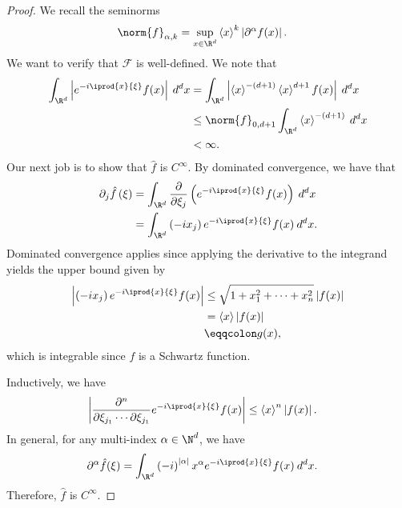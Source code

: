 \documentclass[10pt]{mypackage}
\renewcommand{\eqcolon}{\eqqcolon}
\begin{document}
\begin{proof}
  We recall the seminorms
  \begin{align*}
    \norm{f}_{\alpha,k} &= \sup_{x\in \R^d} \left\langle x \right\rangle^{k} \left\vert \partial^{\alpha}f(x) \right\vert.
  \end{align*}
  We want to verify that $ \mathcal{F} $ is well-defined. We note that
  \begin{align*}
    \int_{\R^{d}}^{} \left\vert e^{-i \iprod{x}{\xi}} f(x)\right\vert\:d^{d}x &= \int_{\R^d}^{} \left\vert \left\langle x \right\rangle^{-\left( d+1 \right)} \left\langle x \right\rangle^{d+1} f(x) \right\vert\:d^{d}x\\
                                                                              &\leq \norm{f}_{0,d+1} \int_{\R^d}^{} \left\langle x \right\rangle^{-\left( d+1 \right)}\:d^{d}x\\
                                                                              &< \infty.
  \end{align*}
  Our next job is to show that $ \hat{f} $ is $C^{\infty}$. By dominated convergence, we have that
  \begin{align*}
    \partial_{j}\hat{f}\left( \xi \right) &= \int_{\R^d}^{} \frac{\partial}{\partial \xi_j}\left( e^{-i \iprod{x}{\xi}}f(x) \right)\:d^{d}x\\
                                          &= \int_{\R^d}^{} \left( -ix_j \right)e^{-i \iprod{x}{\xi}}f(x)\:d^{d}x.
  \end{align*}
  Dominated convergence applies since applying the derivative to the integrand yields the upper bound given by
  \begin{align*}
    \left\vert \left( -ix_j \right)e^{-i \iprod{x}{\xi}}f(x) \right\vert&\leq \sqrt{1 + x_1^2 + \cdots + x_n^2} \left\vert f(x) \right\vert\\
                                                                        &= \left\langle x \right\rangle\left\vert f(x) \right\vert\\
                                                                        &\eqcolon g(x),
  \end{align*}
  which is integrable since $f$ is a Schwartz function.

  Inductively, we have
  \begin{align*}
    \left\vert \frac{\partial^{n}}{\partial \xi_{j_1}\cdots \partial \xi_{j_1}} e^{-i \iprod{x}{\xi}}f(x) \right\vert &\leq \left\langle x \right\rangle^{n} \left\vert f(x) \right\vert.
  \end{align*}
  In general, for any multi-index $\alpha\in \N^{d}$, we have
  \begin{align*}
    \partial^{\alpha}\hat{f}(\xi) &= \int_{\R^d}^{} \left( -i \right)^{\left\vert \alpha \right\vert}x^{\alpha} e^{-i \iprod{x}{\xi}}f(x)\:d^{d}x.
  \end{align*}
  Therefore, $\hat{f}$ is $C^{\infty}$.


\end{proof}
\end{document}
